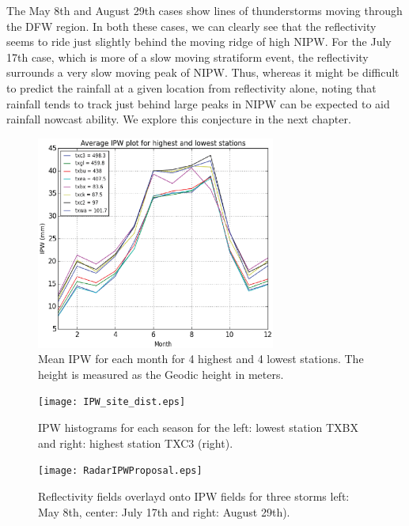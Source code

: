 \documentclass[proposal]{umassthesis}
\begin{document}
The May 8th and August 29th cases show lines of thunderstorms moving through the DFW region. In both these cases, we can clearly see that the reflectivity seems to ride just slightly behind the moving ridge of high NIPW. For the July 17th case, which is more of a slow moving stratiform event, the reflectivity surrounds a very slow moving peak of NIPW. Thus, whereas it might be difficult to predict the rainfall at a given location from reflectivity alone, noting that rainfall tends to track just behind large peaks in NIPW can be expected to aid rainfall nowcast ability. We explore this conjecture in the next chapter.


\begin{figure}[!t]
\begin{center}
\includegraphics[width = 0.7\textwidth]{Highest_Lowest_Sites.eps}
\caption{Mean IPW for each month for 4 highest and 4 lowest stations. The height is measured as the Geodic height in meters.}
\label{fig:Highest_Lowest_Site}
\end{center}
\end{figure}

\begin{figure}[!t]
\begin{center}
\texttt{[image: IPW\_site\_dist.eps]}
\caption{IPW histograms for each season for the left: lowest station TXBX and right: highest station TXC3 (right).}
\label{fig:IPW_site_dist}
\end{center}
\end{figure}

\begin{figure}[!h]
\begin{center}
\texttt{[image: RadarIPWProposal.eps]}
\caption{Reflectivity fields overlayd onto IPW fields for three storms left: May 8th, center: July 17th and right: August 29th).}\label{fig:ipw_radar}
\end{center}
\end{figure}
\end{document}
